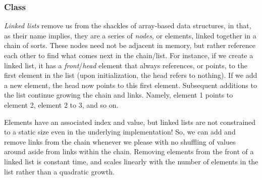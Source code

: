 \subsubsection*{ Class}
\emph{Linked lists} remove us from the shackles of array-based data structures, in that, as their name implies, they are a series of \emph{nodes}, or elements, linked together in a chain of sorts. These nodes need not be adjacent in memory, but rather reference each other to find what comes next in the chain/list. For instance, if we create a linked list, it has a \emph{front}/\emph{head} element that always references, or points, to the first element in the list (upon initialization, the head refers to nothing). If we add a new element, the head now points to this first element. Subsequent additions to the list continue growing the chain and links. Namely, element 1 points to element 2, element 2 to 3, and so on. 

Elements have an associated index and value, but linked lists are not constrained to a static size even in the underlying implementation! So, we can add and remove links from the chain whenever we please with no shuffling of values around aside from links within the chain. Removing elements from the front of a linked list is constant time, and scales linearly with the number of elements in the list rather than a quadratic growth.

